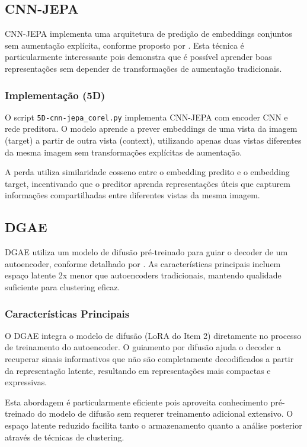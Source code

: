 \subsection{CNN-JEPA}

CNN-JEPA implementa uma arquitetura de predição de embeddings conjuntos sem aumentação explícita, conforme proposto por \cite{kalapos2025cnnjepa}. Esta técnica é particularmente interessante pois demonstra que é possível aprender boas representações sem depender de transformações de aumentação tradicionais.

\subsubsection{Implementação (5D)}

O script \texttt{5D-cnn-jepa\_corel.py} implementa CNN-JEPA com encoder CNN e rede preditora. O modelo aprende a prever embeddings de uma vista da imagem (target) a partir de outra vista (context), utilizando apenas duas vistas diferentes da mesma imagem sem transformações explícitas de aumentação.

A perda utiliza similaridade cosseno entre o embedding predito e o embedding target, incentivando que o preditor aprenda representações úteis que capturem informações compartilhadas entre diferentes vistas da mesma imagem.

\subsection{DGAE}

DGAE utiliza um modelo de difusão pré-treinado para guiar o decoder de um autoencoder, conforme detalhado por \cite{liu2025dgae}. As características principais incluem espaço latente 2x menor que autoencoders tradicionais, mantendo qualidade suficiente para clustering eficaz.

\subsubsection{Características Principais}

O DGAE integra o modelo de difusão (LoRA do Item 2) diretamente no processo de treinamento do autoencoder. O guiamento por difusão ajuda o decoder a recuperar sinais informativos que não são completamente decodificados a partir da representação latente, resultando em representações mais compactas e expressivas.

Esta abordagem é particularmente eficiente pois aproveita conhecimento pré-treinado do modelo de difusão sem requerer treinamento adicional extensivo. O espaço latente reduzido facilita tanto o armazenamento quanto a análise posterior através de técnicas de clustering.

